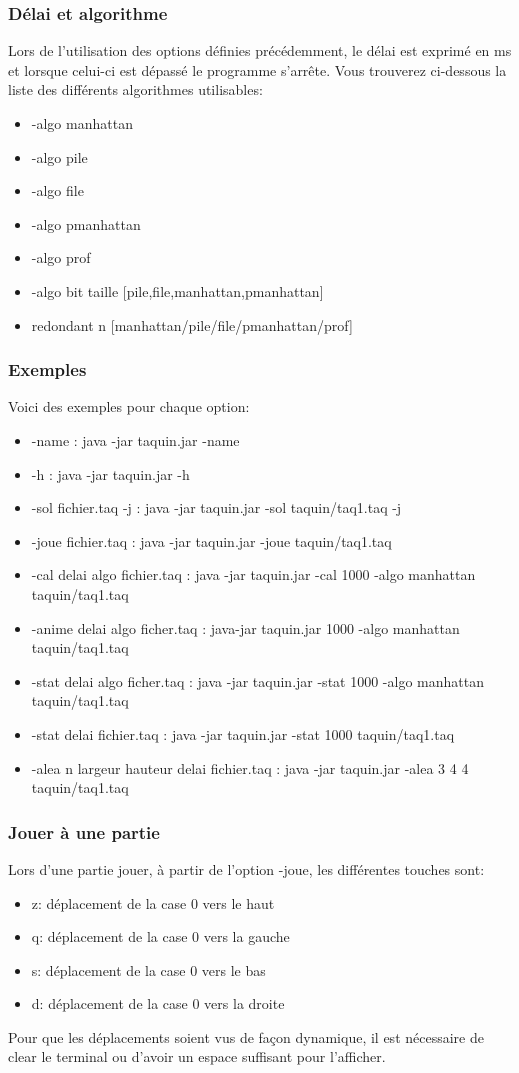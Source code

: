 \documentclass{beamer}
\begin{document}
  \begin{frame}
	\frametitle{Délai et algorithme}
	Lors de l'utilisation des options définies précédemment, le délai est exprimé en ms et lorsque celui-ci est dépassé le programme s'arrête. Vous trouverez ci-dessous la liste des différents algorithmes utilisables:
	\begin{itemize}
	\item -algo manhattan
	\item -algo pile
	\item -algo file
	\item -algo pmanhattan
	\item -algo prof 
	\item -algo bit taille [pile,file,manhattan,pmanhattan]
	\item redondant n [manhattan/pile/file/pmanhattan/prof]
	\end{itemize}
  \end{frame}
  \begin{frame}
   \frametitle{Exemples}
	Voici des exemples pour chaque option:
\begin{itemize}
	\item -name : java -jar taquin.jar -name
	\item -h : java -jar taquin.jar -h
	\item -sol fichier.taq -j : java -jar taquin.jar -sol taquin/taq1.taq -j
	\item -joue fichier.taq : java -jar taquin.jar -joue taquin/taq1.taq
	\item -cal delai algo fichier.taq : java -jar taquin.jar -cal 1000 -algo manhattan taquin/taq1.taq 
	\item -anime delai algo ficher.taq : java-jar taquin.jar 1000 -algo manhattan taquin/taq1.taq
	\item -stat delai algo ficher.taq : java -jar taquin.jar -stat 1000 -algo manhattan taquin/taq1.taq 
	\item -stat delai fichier.taq : java -jar taquin.jar -stat 1000 taquin/taq1.taq
	\item -alea n largeur hauteur delai fichier.taq : java -jar taquin.jar -alea 3 4 4 taquin/taq1.taq
	\end{itemize}
  \end{frame}
  \begin{frame}
   \frametitle{Jouer à une partie}
	Lors d'une partie jouer, à partir de l'option -joue, les différentes touches sont:
	\begin{itemize}
	\item z: déplacement de la case 0 vers le haut
	\item q: déplacement de la case 0 vers la gauche
	\item s: déplacement de la case 0 vers le bas
	\item d: déplacement de la case 0 vers la droite
	\end{itemize}
	Pour que les déplacements soient vus de façon dynamique, il est nécessaire de clear le terminal ou d'avoir un espace suffisant pour l'afficher.
	\end{frame}
\end{document}
